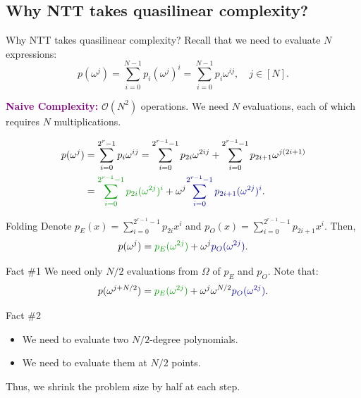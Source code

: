 \documentclass{zkdl-presentation-template}
\begin{document}
    \subsection{Why NTT takes quasilinear complexity?}

    \begin{frame}{Why NTT takes quasilinear complexity?}
        Recall that we need to evaluate $N$ expressions:
        \begin{equation*}
            p(\omega^j) = \sum_{i=0}^{N-1}p_i(\omega^j)^i = \sum_{i=0}^{N-1}p_i\omega^{ij}, \quad j \in [N].
        \end{equation*}

        \textcolor{purple}{\textbf{Naive Complexity:}} $\mathcal{O}(N^2)$ operations. We need $N$ evaluations, 
        each of which requires $N$ multiplications.

        \begin{align*}
            p(\omega^j) &= \sum_{i=0}^{2^r-1}p_i\omega^{ij} = \sum_{i=0}^{2^{r-1}-1}p_{2i}\omega^{2ij} + \sum_{i=0}^{2^{r-1}-1}p_{2i+1}\omega^{j(2i+1)}\\
            &= \textcolor{green!60!black}{\sum_{i=0}^{2^{r-1}-1}p_{2i}(\omega^{2j})^i} + \omega^j\textcolor{blue!60!black}{\sum_{i=0}^{2^{r-1}-1}p_{2i+1}(\omega^{2j})^i}.
        \end{align*}
    \end{frame}

    \begin{frame}{Folding}
        Denote $p_E(x) = \sum_{i=0}^{2^{r-1}-1}p_{2i}x^i$ and $p_O(x) = \sum_{i=0}^{2^{r-1}-1}p_{2i+1}x^i$. Then,
        \begin{equation*}
            p(\omega^j) = \textcolor{green!60!black}{p_E(\omega^{2j})} + \omega^j \textcolor{blue!60!black}{p_O(\omega^{2j})}.
        \end{equation*}

        \begin{block}{Fact \#1}
            We need only $N/2$ evaluations from $\Omega$ of $p_E$ and $p_O$. Note that:
            \begin{equation*}
                p(\omega^{j+N/2}) = \textcolor{green!60!black}{p_E(\omega^{2j})} + \omega^j\omega^{N/2} \textcolor{blue!60!black}{p_O(\omega^{2j})}.
            \end{equation*}
        \end{block}

        \begin{block}{Fact \#2}
            \begin{itemize}
                \item We need to evaluate two $N/2$-degree polynomials.
                \item We need to evaluate them at $N/2$ points.
            \end{itemize}

            Thus, we shrink the problem size by half at each step.
        \end{block}
    \end{frame}
\end{document}
